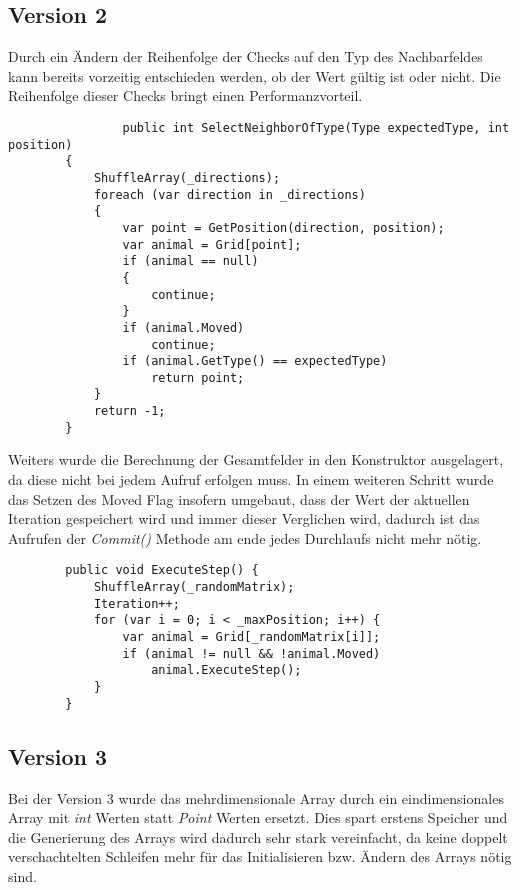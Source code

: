 \documentclass[a4paper,ngerman]{scrartcl}
\begin{document}
\subsection{Version 2}
Durch ein Ändern der Reihenfolge der Checks auf den Typ des Nachbarfeldes kann bereits vorzeitig entschieden werden, ob der Wert gültig ist oder nicht. Die Reihenfolge dieser Checks bringt einen Performanzvorteil. 

	\begin{lstlisting}
				public int SelectNeighborOfType(Type expectedType, int position)
        {
            ShuffleArray(_directions);
            foreach (var direction in _directions)
            {
                var point = GetPosition(direction, position);
                var animal = Grid[point];
                if (animal == null)
                {
                    continue;
                }
                if (animal.Moved)
                    continue;
                if (animal.GetType() == expectedType)
                    return point;
            }
            return -1;
        }
	\end{lstlisting}


Weiters wurde die Berechnung der Gesamtfelder in den Konstruktor ausgelagert, da diese nicht bei jedem Aufruf erfolgen muss. In einem weiteren Schritt wurde das Setzen des Moved Flag insofern umgebaut, dass der Wert der aktuellen Iteration gespeichert wird und immer dieser Verglichen wird, dadurch ist das Aufrufen der \textit{Commit()} Methode am ende jedes Durchlaufs nicht mehr nötig. 

	\begin{lstlisting}
        public void ExecuteStep() {
            ShuffleArray(_randomMatrix);
            Iteration++;
            for (var i = 0; i < _maxPosition; i++) {
                var animal = Grid[_randomMatrix[i]];
                if (animal != null && !animal.Moved)
                    animal.ExecuteStep();
            }
        }
	\end{lstlisting}

\subsection{Version 3}
Bei der Version 3 wurde das mehrdimensionale Array durch ein eindimensionales Array mit \textit{int} Werten statt \textit{Point} Werten ersetzt. Dies spart erstens Speicher und die Generierung des Arrays wird dadurch sehr stark vereinfacht, da keine doppelt verschachtelten Schleifen mehr für das Initialisieren bzw. Ändern des Arrays nötig sind.
\end{document}
